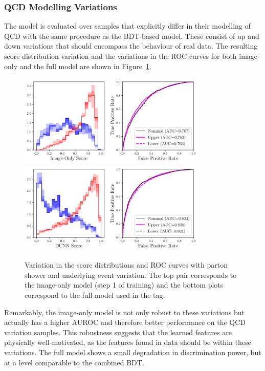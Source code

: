 \subsubsection{QCD Modelling Variations}
The model is evaluated over samples that explicitly differ in their modelling of QCD with the same procedure as the BDT-based model.
These consist of up and down variations that should encompass the behaviour of real data.
The resulting score distribution variation and the variations in the ROC curves for both image-only and the full model are shown in Figure~\ref{fig:event_categorisation:DCNN_psvar}.
\begin{figure}[h!]
    \centering
    \includegraphics[width=0.80\textwidth]{figures/event_selection/imgonly_PSvar_PS.pdf}
    \includegraphics[width=0.80\textwidth]{figures/event_selection/int_PSvar_PS.pdf}
    \caption{Variation in the score distributions and ROC curves with parton shower and underlying event variation. The top pair corresponds to the image-only model (step 1 of training) and the bottom plots correspond to the full model used in the tag.}
    \label{fig:event_categorisation:DCNN_psvar}
\end{figure}

Remarkably, the image-only model is not only robust to these variations but actually has a higher AUROC and therefore better performance on the QCD variation samples.
This robustness suggests that the learned features are physically well-motivated, as the features found in data should be within these variations.
The full model shows a small degradation in discrimination power, but at a level comparable to the combined BDT. 

